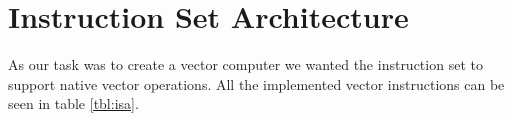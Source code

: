 \section{Instruction Set Architecture}

As our task was to create a vector computer we wanted the instruction set to support native vector operations.
All the implemented vector instructions can be seen in table \ref{tbl:isa}.
